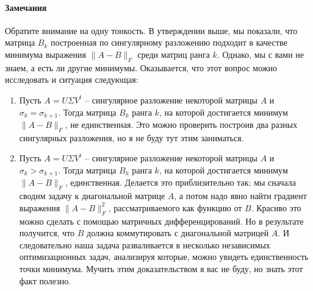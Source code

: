 \paragraph{Замечания}

Обратите внимание на одну тонкость.
 В утверждении выше, мы показали, что матрица $B_k$ построенная по сингулярному разложению подходит в качестве минимума выражения $\|A - B\|_F$ среди матриц ранга $k$.
 Однако, мы с вами не знаем, а есть ли другие минимумы.
 Оказывается, что этот вопрос можно исследовать и ситуация следующая:
\begin{enumerate}
\item Пусть $A = U \Sigma V^t$ -- сингулярное разложение некоторой матрицы $A$ и $\sigma_k = \sigma_{k+1}$.
Тогда матрица $B_k$ ранга $k$, на которой достигается минимум $\|A - B\|_F$, не единственная.
Это можно проверить построив два разных сингулярных разложения, но я не буду тут этим заниматься.

\item Пусть $A = U \Sigma V^t$ -- сингулярное разложение некоторой матрицы $A$ и $\sigma_k > \sigma_{k+1}$.
Тогда матрица $B_k$ ранга $k$, на которой достигается минимум $\|A - B\|_F$, единственная.
Делается это приблизительно так: мы сначала сводим задачу к диагональной матрице $A$, а потом надо явно найти градиент выражения $\|A - B\|_F^2$, рассматриваемого как функцию от $B$.
Красиво это можно сделать с помощью матричных дифференцирований.
Но в результате получится, что $B$ должна коммутировать с диагональной матрицей $A$.
И следовательно наша задача разваливается в несколько независимых оптимизационных задач, анализируя которые, можно увидеть единственность точки минимума.
Мучить этим доказательством я вас не буду, но знать этот факт полезно.
\end{enumerate}

